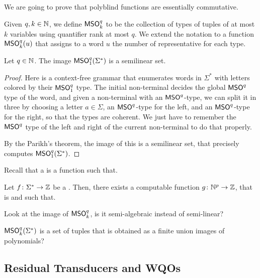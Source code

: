 We are going to prove that polyblind functions are essentially
commutative.

\AP Given $q,k \in \mathbb{N}$, we define $\mathsf{MSO}^q_k$ to be the collection of types of
tuples of at most $k$ variables using quantifier rank at most $q$. We extend
the notation to a function $\mathsf{MSO}^q_k (u)$ that assigns to a word $u$ the number
of representative for each type.

\begin{lemma}
    Let $q \in \mathbb{N}$. The image
    $\mathsf{MSO}^q_1(\Sigma^*)$ is a semilinear set.
\end{lemma}
\begin{proof}
    Here is a context-free grammar that enumerates words
    in $\Sigma^*$ with letters colored by their $\mathsf{MSO}^q_1$ type.
    The initial non-terminal decides the global $\mathsf{MSO}^q$ type of the word,
    and given a non-terminal with an $\mathsf{MSO}^q$-type, we can split it in three
    by choosing a letter $a \in \Sigma$, an $\mathsf{MSO}^q$-type for the left,
    and an $\mathsf{MSO}^q$-type for the right, so that the types are coherent.
    We just have to remember the $\mathsf{MSO}^q$ type of the left and right
    of the current non-terminal to do that properly.

    By the Parikh’s theorem, the image of this is a semilinear set, that
    precisely computes $\mathsf{MSO}^q_1(\Sigma^*)$.
\end{proof}

\AP
Recall that a  is a function such that.

\begin{lemma}
    Let $f \colon \Sigma^* \to \mathbb{Z}$ be a .
    Then, there exists a computable function $g \colon \mathbb{N}^p \to \mathbb{Z}$,
    that is  and such that.
\end{lemma}

\AP
Look at the image of $\mathsf{MSO}^q_k$, is it semi-algebraic instead of semi-linear?
\begin{lemma}
    $\mathsf{MSO}^q_k(\Sigma^*)$ is a set of tuples that is obtained as a finite union 
    images of polynomials?
\end{lemma}


\subsection{}

\subsection{Residual Transducers and WQOs}

